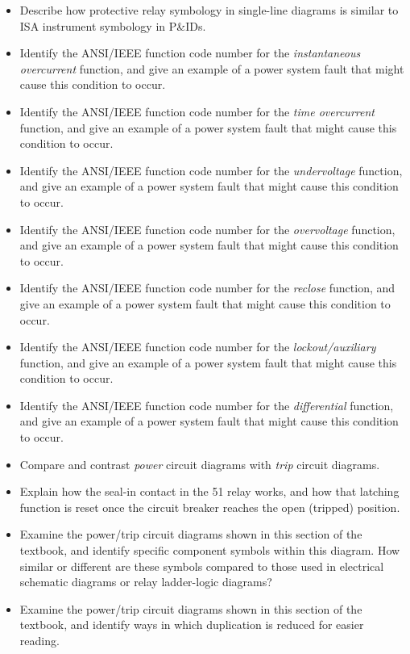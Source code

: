 \begin{itemize}
\item{} Describe how protective relay symbology in single-line diagrams is similar to ISA instrument symbology in P\&IDs.
\item{} Identify the ANSI/IEEE function code number for the {\it instantaneous overcurrent} function, and give an example of a power system fault that might cause this condition to occur.
\item{} Identify the ANSI/IEEE function code number for the {\it time overcurrent} function, and give an example of a power system fault that might cause this condition to occur.
\item{} Identify the ANSI/IEEE function code number for the {\it undervoltage} function, and give an example of a power system fault that might cause this condition to occur.
\item{} Identify the ANSI/IEEE function code number for the {\it overvoltage} function, and give an example of a power system fault that might cause this condition to occur.
\item{} Identify the ANSI/IEEE function code number for the {\it reclose} function, and give an example of a power system fault that might cause this condition to occur.
\item{} Identify the ANSI/IEEE function code number for the {\it lockout/auxiliary} function, and give an example of a power system fault that might cause this condition to occur.
\item{} Identify the ANSI/IEEE function code number for the {\it differential} function, and give an example of a power system fault that might cause this condition to occur.
\item{} Compare and contrast {\it power} circuit diagrams with {\it trip} circuit diagrams.
\item{} Explain how the seal-in contact in the 51 relay works, and how that latching function is reset once the circuit breaker reaches the open (tripped) position.
\item{} Examine the power/trip circuit diagrams shown in this section of the textbook, and identify specific component symbols within this diagram.  How similar or different are these symbols compared to those used in electrical schematic diagrams or relay ladder-logic diagrams?
\item{} Examine the power/trip circuit diagrams shown in this section of the textbook, and identify ways in which duplication is reduced for easier reading.
\end{itemize}




